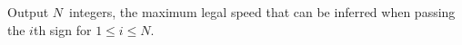 
  Output $N$~integers, the maximum legal speed that can be inferred when passing the $i$th sign for $1\leq i\leq N$.
